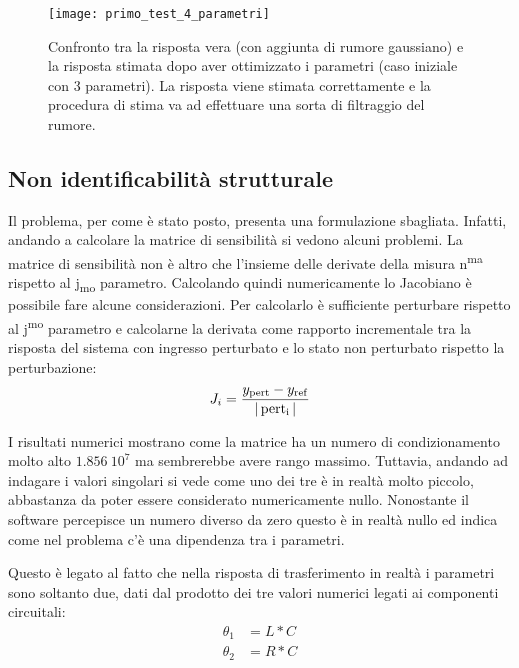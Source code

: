 \begin{figure}
	\centering
\texttt{[image: primo\_test\_4\_parametri]}
\caption{Confronto tra la risposta vera (con aggiunta di rumore gaussiano) e la risposta stimata dopo aver ottimizzato i parametri (caso iniziale con 3 parametri). La risposta viene stimata correttamente e la procedura di stima va ad effettuare una sorta di filtraggio del rumore.}
\label{fig:primo_test_4_parametri}
\end{figure}

\subsection{Non identificabilità strutturale}

Il problema, per come è stato posto, presenta una formulazione sbagliata. Infatti, andando a calcolare la matrice di sensibilità si vedono alcuni problemi. La matrice di sensibilità non è altro che l'insieme delle derivate della misura n\textsuperscript{ma} rispetto al j\textsubscript{mo} parametro. Calcolando quindi numericamente lo Jacobiano è possibile fare alcune considerazioni. 
Per calcolarlo è sufficiente perturbare rispetto al j\textsuperscript{mo} parametro e calcolarne la derivata come rapporto incrementale tra la risposta del sistema con ingresso perturbato e lo stato non perturbato rispetto la perturbazione:
\begin{equation}
	J_{i}={y_{\operatorname{pert}}-y_{\operatorname{ref}}\over |\operatorname{pert_i}|}
\end{equation}

I risultati numerici mostrano come la matrice ha un numero di condizionamento molto alto $1.856 \:10^7$ ma sembrerebbe avere rango massimo. Tuttavia, andando ad indagare i valori singolari si vede come uno dei tre è in realtà molto piccolo, abbastanza da poter essere considerato numericamente nullo. Nonostante il software percepisce un numero diverso da zero questo è in realtà nullo ed indica come nel problema c'è una dipendenza tra i parametri.

Questo è legato al fatto che nella risposta di trasferimento in realtà i parametri sono soltanto due, dati dal prodotto dei tre valori numerici legati ai componenti circuitali:
\begin{equation}
	\begin{aligned}
		\theta_1&=L*C\\
		\theta_2&=R*C
	\end{aligned}
\end{equation}

